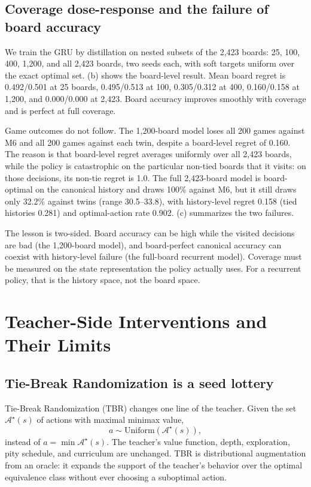 \documentclass[conference]{IEEEtran}
\begin{document}
\subsection{Coverage dose-response and the failure of board accuracy}
We train the GRU by distillation on nested subsets of the 2{,}423 boards: 25, 100, 400, 1{,}200, and all 2{,}423 boards, two seeds each, with soft targets uniform over the exact optimal set. (b) shows the board-level result. Mean board regret is 0.492/0.501 at 25 boards, 0.495/0.513 at 100, 0.305/0.312 at 400, 0.160/0.158 at 1{,}200, and 0.000/0.000 at 2{,}423. Board accuracy improves smoothly with coverage and is perfect at full coverage.

Game outcomes do not follow. The 1{,}200-board model loses all 200 games against M6 and all 200 games against each twin, despite a board-level regret of 0.160. The reason is that board-level regret averages uniformly over all 2{,}423 boards, while the policy is catastrophic on the particular non-tied boards that it visits: on those decisions, its non-tie regret is 1.0. The full 2{,}423-board model is board-optimal on the canonical history and draws 100\% against M6, but it still draws only 32.2\% against twins (range 30.5--33.8), with history-level regret 0.158 (tied histories 0.281) and optimal-action rate 0.902. (c) summarizes the two failures.

The lesson is two-sided. Board accuracy can be high while the visited decisions are bad (the 1{,}200-board model), and board-perfect canonical accuracy can coexist with history-level failure (the full-board recurrent model). Coverage must be measured on the state representation the policy actually uses. For a recurrent policy, that is the history space, not the board space.

\section{Teacher-Side Interventions and Their Limits}
\label{sec:tbr}

\subsection{Tie-Break Randomization is a seed lottery}
Tie-Break Randomization (TBR) changes one line of the teacher. Given the set $\mathcal{A}^{\star}(s)$ of actions with maximal minimax value,
\begin{equation}
\label{eq:tbr}
a \sim \mathrm{Uniform}\left(\mathcal{A}^{\star}(s)\right),
\end{equation}
instead of $a=\min\mathcal{A}^{\star}(s)$. The teacher's value function, depth, exploration, pity schedule, and curriculum are unchanged. TBR is distributional augmentation from an oracle: it expands the support of the teacher's behavior over the optimal equivalence class without ever choosing a suboptimal action.
\end{document}
